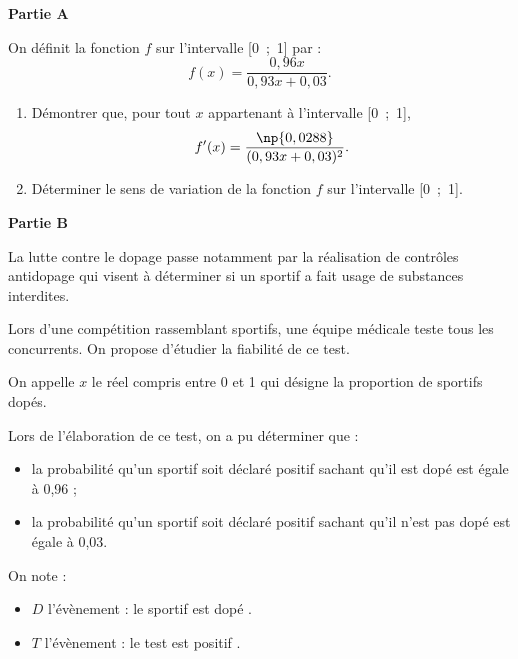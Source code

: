 \medskip

\textbf{Partie A}

\medskip

On définit la fonction $f$ sur l'intervalle [0~;~1] par :
\[f(x) = \dfrac{0,96x}{0,93x + 0,03}.\]

\smallskip

\begin{enumerate}
\item Démontrer que, pour tout $x$ appartenant à l'intervalle [0~;~1], 
\[f'(x) = \dfrac{\np{0,0288}}{(0,93x + 0,03)^2}.\]

\item Déterminer le sens de variation de la fonction $f$ sur l'intervalle [0~;~1].
\end{enumerate}

\medskip

\textbf{Partie B}

La lutte contre le dopage passe notamment par la réalisation de contrôles antidopage qui visent à déterminer si un sportif a fait usage de substances interdites.

Lors d'une compétition rassemblant  sportifs, une équipe médicale teste tous les concurrents. On propose d'étudier la fiabilité de ce test.

On appelle $x$ le réel compris entre 0 et 1 qui désigne la proportion de sportifs dopés.

Lors de l'élaboration de ce test, on a pu déterminer que :

\begin{itemize}[label=$\bullet~$]
\item la probabilité qu'un sportif soit déclaré positif sachant qu'il est dopé est égale
à 0,96 ;
\item  la probabilité qu'un sportif soit déclaré positif sachant qu'il n'est pas dopé est égale à 0,03.
\end{itemize}

On note :

\begin{itemize}[label=$\bullet~$]
\item $D$ l'évènement : \og le sportif est dopé \fg.
\item $T$ l'évènement : \og le test est positif \fg.
\end{itemize}

\medskip

